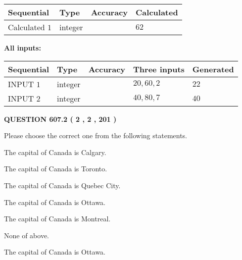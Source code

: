 \documentclass[12pt]{article}
\begin{document}
   
  
  
\noindent\begin{tabular}{|l|l|l|l|}
\hline
 Sequential & Type & Accuracy & Calculated \\ 
\hline
 
 
  Calculated $  1 $ & integer &  & 
  $ 62 $ 
 \\  \hline  
 \end{tabular}
   
   
   
   
\noindent\vspace{0.1in}\hspace{-0.08in} {\textbf{\Large{All inputs: }}}
   
   
  
  
\noindent\begin{tabular}{|l|l|l|l|l|}
\hline
 Sequential & Type & Accuracy & Three inputs & Generated \\ 
\hline
 
 
  INPUT $  1 $ & integer &  & $
 20
 , 
 60
 , 
 2
 $ & $ 22 $ 
 \\  \hline  
 
 
  INPUT $  2 $ & integer &  & $
 40
 , 
 80
 , 
 7
 $ & $ 40 $ 
 \\  \hline  
 \end{tabular}
   
   
  
\vspace{0.2in}
  
{\textbf{\Large{QUESTION
607.2 
 ( 2 , 2 , 201 )
}}}
  
  
Please choose the correct one from the following statements.
 
 
The capital of Canada is Calgary.
 
 
The capital of Canada is Toronto.
 
 
The capital of Canada is Quebec City.
 
 
The capital of Canada is Ottawa.
 
 
The capital of Canada is Montreal.
 
 
 None of above.
 
 
\noindent{}
 
 
The capital of Canada is Ottawa.
 
\end{document}

